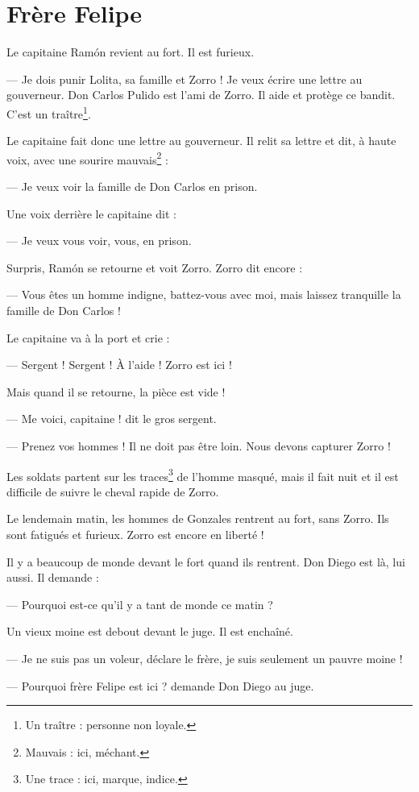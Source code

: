 \chapter{Frère Felipe}
Le capitaine Ramón revient au fort. Il est furieux.

--- Je dois punir Lolita, sa famille et Zorro ! Je veux écrire une lettre au gouverneur. Don Carlos Pulido est l'ami de Zorro. Il
    aide et protège ce bandit. C'est un traître\footnote{Un traître : personne non loyale.}.

Le capitaine fait donc une lettre au gouverneur. Il relit sa lettre et dit, à haute voix, avec une sourire 
mauvais\footnote{Mauvais : ici, méchant.} :

--- Je veux voir la famille de Don Carlos en prison.

Une voix derrière le capitaine dit :

--- Je veux vous voir, vous, en prison.

Surpris, Ramón se retourne et voit Zorro. Zorro dit encore :

--- Vous êtes un homme indigne, battez-vous avec moi, mais laissez tranquille la famille de Don Carlos !

Le capitaine va à la port et crie :

--- Sergent ! Sergent ! À l'aide ! Zorro est ici !

Mais quand il se retourne, la pièce est vide !

--- Me voici, capitaine ! dit le gros sergent.

--- Prenez vos hommes ! Il ne doit pas être loin. Nous devons capturer Zorro !

Les soldats partent sur les traces\footnote{Une trace : ici, marque, indice.} de l'homme masqué, mais il fait nuit et il est
difficile de suivre le cheval rapide de Zorro.

Le lendemain matin, les hommes de Gonzales rentrent au fort, sans Zorro. Ils sont fatigués et furieux. Zorro est encore en
liberté !

Il y a beaucoup de monde devant le fort quand ils rentrent. Don Diego est là, lui aussi. Il demande :

--- Pourquoi est-ce qu'il y a tant de monde ce matin ?

Un vieux moine est debout devant le juge. Il est enchaîné.

--- Je ne suis pas un voleur, déclare le frère, je suis seulement un pauvre moine !

--- Pourquoi frère Felipe est ici ? demande Don Diego au juge.

